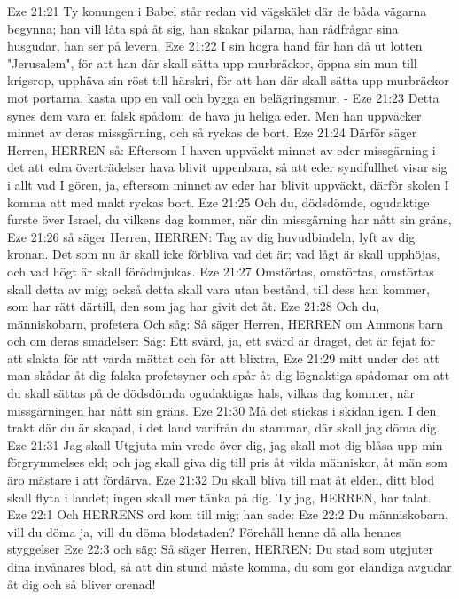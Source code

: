 Eze 21:21  Ty konungen i Babel står redan vid vägskälet där de båda vägarna begynna; han vill låta spå åt sig, han skakar pilarna, han rådfrågar sina husgudar, han ser på levern.
Eze 21:22  I sin högra hand får han då ut lotten "Jerusalem", för att han där skall sätta upp murbräckor, öppna sin mun till krigsrop, upphäva sin röst till härskri, för att han där skall sätta upp murbräckor mot portarna, kasta upp en vall och bygga en belägringsmur. -
Eze 21:23  Detta synes dem vara en falsk spådom: de hava ju heliga eder. Men han uppväcker minnet av deras missgärning, och så ryckas de bort.
Eze 21:24  Därför säger Herren, HERREN så: Eftersom I haven uppväckt minnet av eder missgärning i det att edra överträdelser hava blivit uppenbara, så att eder syndfullhet visar sig i allt vad I gören, ja, eftersom minnet av eder har blivit uppväckt, därför skolen I komma att med makt ryckas bort.
Eze 21:25  Och du, dödsdömde, ogudaktige furste över Israel, du vilkens dag kommer, när din missgärning har nått sin gräns,
Eze 21:26  så säger Herren, HERREN: Tag av dig huvudbindeln, lyft av dig kronan. Det som nu är skall icke förbliva vad det är; vad lågt är skall upphöjas, och vad högt är skall förödmjukas.
Eze 21:27  Omstörtas, omstörtas, omstörtas skall detta av mig; också detta skall vara utan bestånd, till dess han kommer, som har rätt därtill, den som jag har givit det åt.
Eze 21:28  Och du, människobarn, profetera Och såg: Så säger Herren, HERREN om Ammons barn och om deras smädelser: Säg: Ett svärd, ja, ett svärd är draget, det är fejat för att slakta för att varda mättat och för att blixtra,
Eze 21:29  mitt under det att man skådar åt dig falska profetsyner och spår åt dig lögnaktiga spådomar om att du skall sättas på de dödsdömda ogudaktigas hals, vilkas dag kommer, när missgärningen har nått sin gräns.
Eze 21:30  Må det stickas i skidan igen. I den trakt där du är skapad, i det land varifrån du stammar, där skall jag döma dig.
Eze 21:31  Jag skall Utgjuta min vrede över dig, jag skall mot dig blåsa upp min förgrymmelses eld; och jag skall giva dig till pris åt vilda människor, åt män som äro mästare i att fördärva.
Eze 21:32  Du skall bliva till mat åt elden, ditt blod skall flyta i landet; ingen skall mer tänka på dig. Ty jag, HERREN, har talat.
Eze 22:1  Och HERRENS ord kom till mig; han sade:
Eze 22:2  Du människobarn, vill du döma ja, vill du döma blodstaden? Förehåll henne då alla hennes styggelser
Eze 22:3  och säg: Så säger Herren, HERREN: Du stad som utgjuter dina invånares blod, så att din stund måste komma, du som gör eländiga avgudar åt dig och så bliver orenad!
